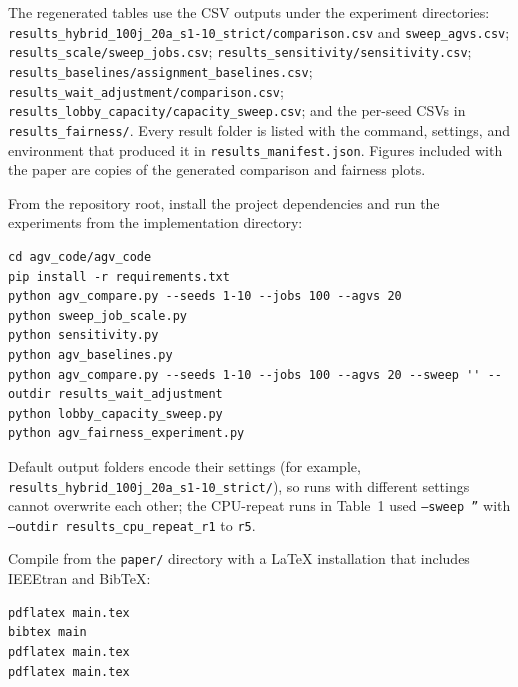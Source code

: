 The regenerated tables use the CSV outputs under the experiment directories:
\texttt{results\_hybrid\_100j\_20a\_s1-10\_strict/comparison.csv} and
\texttt{sweep\_agvs.csv};
\texttt{results\_scale/sweep\_jobs.csv};
\texttt{results\_sensitivity/sensitivity.csv};
\texttt{results\_baselines/assignment\_baselines.csv};
\texttt{results\_wait\_adjustment/comparison.csv};
\texttt{results\_lobby\_capacity/capacity\_sweep.csv}; and the per-seed
CSVs in \texttt{results\_fairness/}. Every result folder is listed with the
command, settings, and environment that produced it in
\texttt{results\_manifest.json}. Figures included with the paper are
copies of the generated comparison and fairness plots.

From the repository root, install the project dependencies and run the
experiments from the implementation directory:
\begin{verbatim}
cd agv_code/agv_code
pip install -r requirements.txt
python agv_compare.py --seeds 1-10 --jobs 100 --agvs 20
python sweep_job_scale.py
python sensitivity.py
python agv_baselines.py
python agv_compare.py --seeds 1-10 --jobs 100 --agvs 20 --sweep '' --outdir results_wait_adjustment
python lobby_capacity_sweep.py
python agv_fairness_experiment.py
\end{verbatim}
Default output folders encode their settings (for example,
\texttt{results\_hybrid\_100j\_20a\_s1-10\_strict/}), so runs with different
settings cannot overwrite each other; the CPU-repeat runs in Table~1 used
\texttt{--sweep ''} with \texttt{--outdir results\_cpu\_repeat\_r1} to
\texttt{r5}.

Compile from the \texttt{paper/} directory with a LaTeX installation that
includes IEEEtran and BibTeX:
\begin{verbatim}
pdflatex main.tex
bibtex main
pdflatex main.tex
pdflatex main.tex
\end{verbatim}
